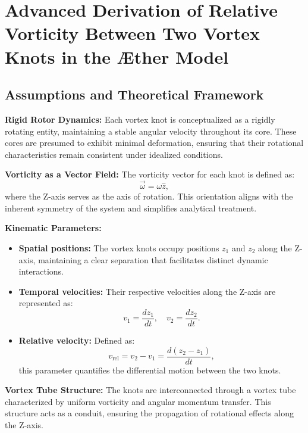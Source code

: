 

    \section{Advanced Derivation of Relative Vorticity Between Two Vortex Knots in the Æther Model}

    \subsection*{Assumptions and Theoretical Framework}
    \textbf{Rigid Rotor Dynamics:} Each vortex knot is conceptualized as a rigidly rotating entity, maintaining a stable angular velocity throughout its core. These cores are presumed to exhibit minimal deformation, ensuring that their rotational characteristics remain consistent under idealized conditions.

    \textbf{Vorticity as a Vector Field:} The vorticity vector for each knot is defined as:
    \begin{equation*}
        \vec{\omega} = \omega \hat{z},
    \end{equation*}
    where the Z-axis serves as the axis of rotation. This orientation aligns with the inherent symmetry of the system and simplifies analytical treatment.

    \textbf{Kinematic Parameters:}
    \begin{itemize}
        \item \textbf{Spatial positions:} The vortex knots occupy positions $z_1$ and $z_2$ along the Z-axis, maintaining a clear separation that facilitates distinct dynamic interactions.
        \item \textbf{Temporal velocities:} Their respective velocities along the Z-axis are represented as:
        \begin{equation*}
            v_1 = \frac{dz_1}{dt}, \quad v_2 = \frac{dz_2}{dt}.
        \end{equation*}
        \item \textbf{Relative velocity:} Defined as:
        \begin{equation*}
            v_{\text{rel}} = v_2 - v_1 = \frac{d(z_2 - z_1)}{dt},
        \end{equation*}
        this parameter quantifies the differential motion between the two knots.
    \end{itemize}

    \textbf{Vortex Tube Structure:} The knots are interconnected through a vortex tube characterized by uniform vorticity and angular momentum transfer. This structure acts as a conduit, ensuring the propagation of rotational effects along the Z-axis.

